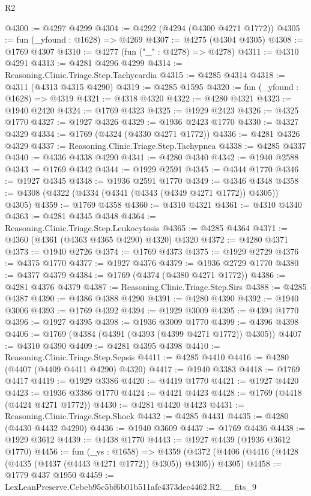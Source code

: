 \begin{lexlean}{R2}
\begin{coremodule}
@4300 := @4297 @4299
@4304 := @4292 (@4294 (@4300 @4271 @1772))
@4305 := fun (_yfound : @1628) => @4269
@4307 := @4275 (@4304 @4305)
@4308 := @1769 @4307
@4310 := @4277 (fun ("_" : @4278) => @4278)
@4311 := @4310 @4291
@4313 := @4281 @4296 @4299
@4314 := Reasoning.Clinic.Triage.Step.Tachycardia
@4315 := @4285 @4314
@4318 := @4311 (@4313 @4315 @4290)
@4319 := @4285 @1595
@4320 := fun (_yfound : @1628) => @4319
@4321 := @4318 @4320
@4322 := @4280 @4321
@4323 := @1940 @2420
@4324 := @1769 @4323
@4325 := @1929 @2423
@4326 := @4325 @1770
@4327 := @1927 @4326
@4329 := @1936 @2423 @1770
@4330 := @4327 @4329
@4334 := @1769 (@4324 (@4330 @4271 @1772))
@4336 := @4281 @4326 @4329
@4337 := Reasoning.Clinic.Triage.Step.Tachypnea
@4338 := @4285 @4337
@4340 := @4336 @4338 @4290
@4341 := @4280 @4340
@4342 := @1940 @2588
@4343 := @1769 @4342
@4344 := @1929 @2591
@4345 := @4344 @1770
@4346 := @1927 @4345
@4348 := @1936 @2591 @1770
@4349 := @4346 @4348
@4358 := @4308 (@4322 (@4334 (@4341 (@4343 (@4349 @4271 @1772)) @4305)) @4305)
@4359 := @1769 @4358
@4360 := @4310 @4321
@4361 := @4310 @4340
@4363 := @4281 @4345 @4348
@4364 := Reasoning.Clinic.Triage.Step.Leukocytosis
@4365 := @4285 @4364
@4371 := @4360 (@4361 (@4363 @4365 @4290) @4320) @4320
@4372 := @4280 @4371
@4373 := @1940 @2726
@4374 := @1769 @4373
@4375 := @1929 @2729
@4376 := @4375 @1770
@4377 := @1927 @4376
@4379 := @1936 @2729 @1770
@4380 := @4377 @4379
@4384 := @1769 (@4374 (@4380 @4271 @1772))
@4386 := @4281 @4376 @4379
@4387 := Reasoning.Clinic.Triage.Step.Sirs
@4388 := @4285 @4387
@4390 := @4386 @4388 @4290
@4391 := @4280 @4390
@4392 := @1940 @3006
@4393 := @1769 @4392
@4394 := @1929 @3009
@4395 := @4394 @1770
@4396 := @1927 @4395
@4398 := @1936 @3009 @1770
@4399 := @4396 @4398
@4406 := @1769 (@4384 (@4391 (@4393 (@4399 @4271 @1772)) @4305))
@4407 := @4310 @4390
@4409 := @4281 @4395 @4398
@4410 := Reasoning.Clinic.Triage.Step.Sepsis
@4411 := @4285 @4410
@4416 := @4280 (@4407 (@4409 @4411 @4290) @4320)
@4417 := @1940 @3383
@4418 := @1769 @4417
@4419 := @1929 @3386
@4420 := @4419 @1770
@4421 := @1927 @4420
@4423 := @1936 @3386 @1770
@4424 := @4421 @4423
@4428 := @1769 (@4418 (@4424 @4271 @1772))
@4430 := @4281 @4420 @4423
@4431 := Reasoning.Clinic.Triage.Step.Shock
@4432 := @4285 @4431
@4435 := @4280 (@4430 @4432 @4290)
@4436 := @1940 @3609
@4437 := @1769 @4436
@4438 := @1929 @3612
@4439 := @4438 @1770
@4443 := @1927 @4439 (@1936 @3612 @1770)
@4456 := fun (_ys : @1658) =>
  @4359 (@4372 (@4406 (@4416 (@4428 (@4435 (@4437 (@4443 @4271 @1772)) @4305)) @4305)) @4305)
@4458 := @1779 @437 @1950
@4459 := LexLeanPreserve.Cebeb95c5bf6b01b511afc4373dec4462.R2.__fits_9

\end{coremodule}
\end{lexlean}
